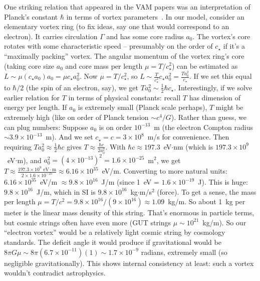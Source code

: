 \documentclass[12pt]{article}
\begin{document}
One striking relation that appeared in the VAM papers was an interpretation of Planck’s constant $\hbar$ in terms of vortex parameters~\cite{ref:vam_planck}. In our model, consider an elementary vortex ring (to fix ideas, say one that would correspond to an electron). It carries circulation $\Gamma$ and has some core radius $a_0$. The vortex’s core rotates with some characteristic speed -- presumably on the order of $c_\star$ if it’s a ``maximally packing'' vortex. The angular momentum of the vortex ring’s core (taking core size $a_0$ and core mass per length $\mu = T/c_\star^2$) can be estimated as $L \sim \mu (c_\star a_0) a_0 = \mu c_\star a_0^2$. Now $\mu = T/c_\star^2$, so $L \sim \frac{T}{c_\star^2} c_\star a_0^2 = \frac{T a_0^2}{c_\star}$. If we set this equal to $\hbar/2$ (the spin of an electron, say), we get $T a_0^2 \sim \frac{1}{2} \hbar c_\star$. Interestingly, if we solve earlier relation for $T$ in terms of physical constants: recall $T$ has dimension of energy per length. If $a_0$ is extremely small (Planck scale perhaps), $T$ might be extremely high (like on order of Planck tension $\sim c^4/G$). Rather than guess, we can plug numbers: Suppose $a_0$ is on order $10^{-13}$~m (the electron Compton radius $\sim 3.9\times10^{-13}$~m). And we set $c_\star = c = 3\times10^8$~m/s for convenience. Then requiring $T a_0^2 \approx \frac{1}{2}\hbar c$ gives $T \approx \frac{\hbar c}{2 a_0^2}$. With $\hbar c \approx 197.3$~eV$\cdot$nm (which is $197.3 \times 10^9$~eV$\cdot$m), and $a_0^2 = (4\times10^{-13})^2 = 1.6\times10^{-25}$~m$^2$, we get $T \approx \frac{197.3\times10^9 \text{ eV}\cdot\text{m}}{2 \times 1.6\times10^{-25}} \approx 6.16\times10^{35}$~eV/m. Converting to more natural units: $6.16\times10^{35}$~eV/m $\approx 9.8\times10^{16}$~J/m (since 1~eV = $1.6\times10^{-19}$~J). This is huge: $9.8\times10^{16}$~J/m, which in SI is $9.8\times10^{16}$~kg$\cdot$m/s$^2$ (force). To get a sense, the mass per length $\mu = T/c^2 = 9.8\times10^{16}/(9\times10^{16}) \approx 1.09$~kg/m. So about 1~kg per meter is the linear mass density of this string. That’s enormous in particle terms, but cosmic strings often have even more (GUT strings $\mu \sim 10^{21}$~kg/m). So our ``electron vortex'' would be a relatively light cosmic string by cosmology standards. The deficit angle it would produce if gravitational would be $8\pi G \mu \sim 8\pi(6.7\times10^{-11})(1) \sim 1.7\times10^{-9}$ radians, extremely small (so negligible gravitationally). This shows internal consistency at least: such a vortex wouldn’t contradict astrophysics.
\end{document}

